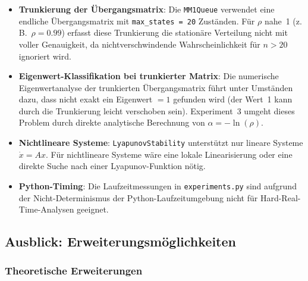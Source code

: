 ﻿\documentclass[a4paper,12pt]{scrreprt}
\theoremstyle{definition}
\begin{document}
\begin{itemize}
	\item \textbf{Trunkierung der Übergangsmatrix}: Die
	\texttt{MM1Queue} verwendet eine endliche Übergangsmatrix
	mit \texttt{max\_states = 20} Zuständen.  Für $\rho$ nahe~1
	(z.\,B.~$\rho = 0.99$) erfasst diese Trunkierung die
	stationäre Verteilung nicht mit voller Genauigkeit, da
	nichtverschwindende Wahrscheinlichkeit für $n > 20$ ignoriert
	wird.
	
	\item \textbf{Eigenwert-Klassifikation bei trunkierter Matrix}:
	Die numerische Eigenwertanalyse der trunkierten
	Übergangsmatrix führt unter Umständen dazu, dass nicht
	exakt ein Eigenwert $= 1$ gefunden wird (der Wert~1 kann
	durch die Trunkierung leicht verschoben sein).  Experiment~3
	umgeht dieses Problem durch direkte analytische Berechnung
	von $\alpha = -\ln(\rho)$.
	
	\item \textbf{Nichtlineare Systeme}: \texttt{LyapunovStability}
	unterstützt nur lineare Systeme $\dot{x} = Ax$.  Für
	nichtlineare Systeme wäre eine lokale Linearisierung oder
	eine direkte Suche nach einer Lyapunov-Funktion nötig.
	
	\item \textbf{Python-Timing}: Die Laufzeitmessungen in
	\texttt{experiments.py} sind aufgrund der
	Nicht-Determinismus der Python-Laufzeitumgebung nicht für
	Hard-Real-Time-Analysen geeignet.
\end{itemize}

\subsection{Ausblick: Erweiterungsmöglichkeiten}
\label{subsec:ausblick}

\subsubsection{Theoretische Erweiterungen}
\end{document}
